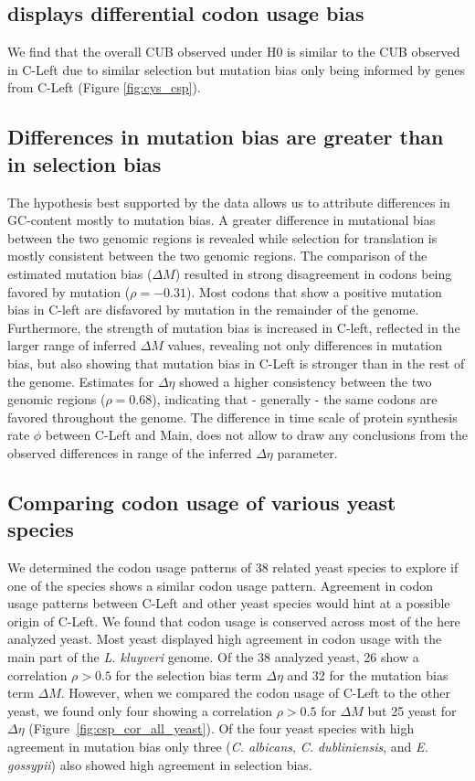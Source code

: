 \documentclass[12pt]{article}
\begin{document}
\subsection*{\kluyveri displays differential codon usage bias}
We find that the overall CUB observed under H0 is similar to the CUB observed in C-Left due to similar selection but mutation bias only being informed by genes from C-Left (Figure \ref{fig:cys_csp}). 


\subsection*{Differences in mutation bias are greater than in selection bias}
The hypothesis best supported by the data allows us to attribute differences in GC-content mostly to mutation bias. 
A greater difference in mutational bias between the two genomic regions is revealed while selection for translation is mostly consistent between the two genomic regions. 
The comparison of the estimated mutation bias ($\Delta M$) resulted in strong disagreement in codons being favored by mutation ($\rho = -0.31$). 
Most codons that show a positive mutation bias in C-left are disfavored by mutation in the remainder of the genome.  
Furthermore, the strength of mutation bias is increased in C-left, reflected in the larger range of inferred $\Delta M$ values, revealing not only differences in mutation bias, but also showing that mutation bias in C-Left is stronger than in the rest of the genome. 
Estimates for $\Delta \eta$ showed a higher consistency between the two genomic regions ($\rho = 0.68$), indicating that - generally - the same codons are favored throughout the genome. 
The difference in time scale of protein synthesis rate $\phi$ between C-Left and Main, does not allow to draw any conclusions from the observed differences in range of the inferred $\Delta \eta$ parameter.

\subsection*{Comparing codon usage of various yeast species}
We determined the codon usage patterns of 38 related yeast species to explore if one of the species shows a similar codon usage pattern.
Agreement in codon usage patterns between C-Left and other yeast species would hint at a possible origin of C-Left.
We found that codon usage is conserved across most of the here analyzed yeast. 
Most yeast displayed high agreement in codon usage with the main part of the \textit{L. kluyveri} genome. Of the 38 analyzed yeast, 26 show a correlation $\rho > 0.5$ for the selection bias term $\Delta \eta$ and 32 for the mutation bias term $\Delta M$.
However, when we compared the codon usage of C-Left to the other yeast, we found only four showing a correlation $\rho > 0.5$ for $\Delta M$ but 25 yeast for $\Delta \eta$ (Figure~\ref{fig:csp_cor_all_yeast}).
Of the four yeast species with high agreement in mutation bias only three (\textit{C. albicans}, \textit{C. dubliniensis}, and \textit{E. gossypii}) also showed high agreement in selection bias.
\end{document}
